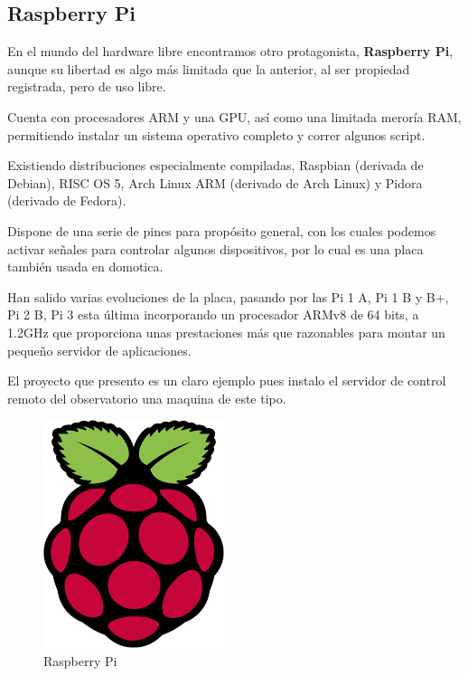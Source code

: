 \newpage

\subsection{Raspberry Pi}

En el mundo del hardware libre encontramos otro protagonista,
\textbf{Raspberry Pi}, aunque su libertad es algo más limitada que la anterior, al ser propiedad registrada, pero de uso libre.

\bigskip
Cuenta con procesadores ARM y una GPU, así como una limitada meroría RAM, permitiendo instalar un sistema operativo completo y correr algunos script. 

\bigskip
Existiendo distribuciones especialmente compiladas, Raspbian (derivada de Debian), RISC OS 5, Arch Linux ARM (derivado de Arch Linux) y Pidora (derivado de Fedora).

\bigskip
Dispone de una serie de pines para propósito general, con los cuales podemos activar señales para controlar algunos dispositivos, por lo cual es una placa también usada en domotica.

\bigskip
Han salido varias evoluciones de la placa, pasando por las Pi 1 A, Pi 1 B y B+, Pi 2 B, Pi 3 esta última incorporando un procesador ARMv8 de 64 bits, a 1.2GHz que proporciona unas prestaciones más que razonables para montar un pequeño servidor de aplicaciones. 

El proyecto que presento es un claro ejemplo pues instalo el servidor de control remoto del observatorio una maquina de este tipo.


\begin{figure}[h]
\centering
\includegraphics[width=0.2\linewidth]{../images/raspberry}
\caption[Raspberry Pi]{Raspberry Pi}
\label{fig:raspberry}
\end{figure}




  